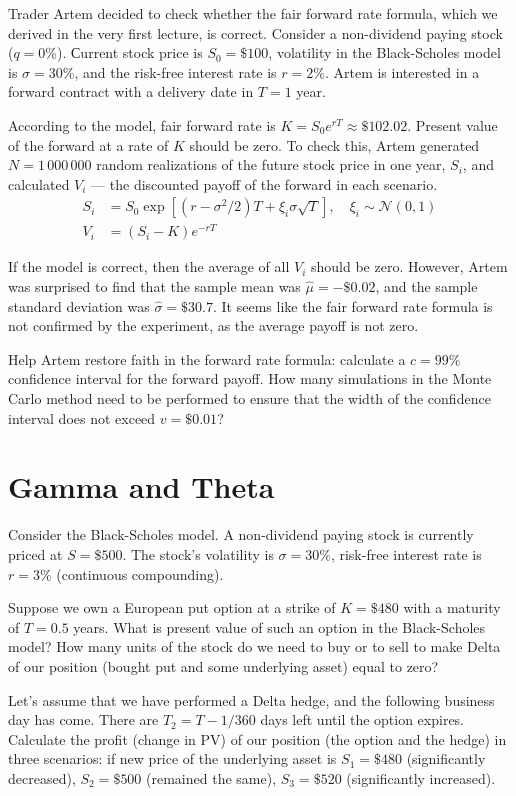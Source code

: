 \documentclass[a4paper,14pt]{extarticle}
\begin{document}
Trader Artem decided to check whether the fair forward rate formula, which we derived in the very first lecture, is correct. Consider a non-dividend paying stock ($q=0\%$). Сurrent stock price is $S_0 = \$100$, volatility in the Black-Scholes model is $\sigma=30\%$, and the risk-free interest rate is $r=2\%$. Artem is interested in a forward contract with a delivery date in $T=1$ year.

According to the model, fair forward rate is $K = S_0e^{rT} \approx \$102.02$. Present value of the forward at a rate of $K$ should be zero. To check this, Artem generated $N=1\,000\,000$ random realizations of the future stock price in one year, $S_i$, and calculated $V_i$ --- the discounted payoff of the forward in each scenario.
\begin{align*}
S_i &= S_0\exp \left[\left(r - \sigma^2/2\right)T + \xi_i\sigma\sqrt{T}\right], \quad \xi_i \sim \mathcal{N}(0, 1) \\
V_i &= (S_i - K)e^{-rT}
\end{align*}

If the model is correct, then the average of all $V_i$ should be zero. However, Artem was surprised to find that the sample mean was $\hat\mu = -\$0.02$, and the sample standard deviation was $\hat\sigma = \$30.7$. It seems like the fair forward rate formula is not confirmed by the experiment, as the average payoff is not zero.

Help Artem restore faith in the forward rate formula: calculate a $c=99\%$ confidence interval for the forward payoff. How many simulations in the Monte Carlo method need to be performed to ensure that the width of the confidence interval does not exceed $v=\$0.01$?

\section{Gamma and Theta}

Consider the Black-Scholes model. A non-dividend paying stock is currently priced at $S=\$500$. The stock's volatility is $\sigma=30\%$, risk-free interest rate is $r=3\%$ (continuous compounding).

Suppose we own a European put option at a strike of $K=\$480$ with a maturity of $T=0.5$ years. What is present value of such an option in the Black-Scholes model? How many units of the stock do we need to buy or to sell to make Delta of our position (bought put and some underlying asset) equal to zero?

Let's assume that we have performed a Delta hedge, and the following business day has come. There are $T_2 = T - 1/360$ days left until the option expires. Calculate the profit (change in PV) of our position (the option and the hedge) in three scenarios: if new price of the underlying asset is $S_1 = \$480$ (significantly decreased), $S_2 = \$500$ (remained the same), $S_3 = \$520$ (significantly increased).
\end{document}

